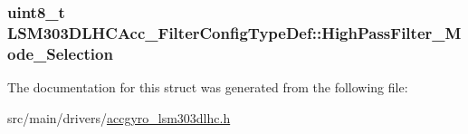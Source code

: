 \hypertarget{structLSM303DLHCAcc__FilterConfigTypeDef_ace3a2b09252915f5134c1270beaac97b}{
\subsubsection[{High\+Pass\+Filter\+\_\+\+Mode\+\_\+\+Selection}]{\setlength{\rightskip}{0pt plus 5cm}uint8\+\_\+t L\+S\+M303\+D\+L\+H\+C\+Acc\+\_\+\+Filter\+Config\+Type\+Def\+::\+High\+Pass\+Filter\+\_\+\+Mode\+\_\+\+Selection}}\label{structLSM303DLHCAcc__FilterConfigTypeDef_ace3a2b09252915f5134c1270beaac97b}


The documentation for this struct was generated from the following file\+:\begin{DoxyCompactItemize}
\item 
src/main/drivers/\hyperlink{accgyro__lsm303dlhc_8h}{accgyro\+\_\+lsm303dlhc.\+h}\end{DoxyCompactItemize}
